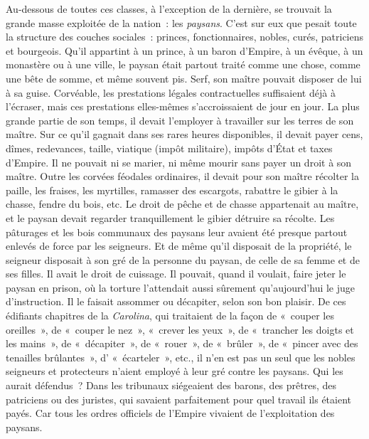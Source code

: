 \documentclass[french,twoside]{book} %
\begin{document}
Au-dessous de toutes ces classes, à l’exception de la dernière, se trouvait la grande masse exploitée de la nation : les \emph{paysans}. C’est sur eux que pesait toute la structure des couches sociales : princes, fonctionnaires, nobles, curés, patriciens et bourgeois. Qu’il appartint à un prince, à un baron d’Empire, à un évêque, à un monastère ou à une ville, le paysan était partout traité comme une chose, comme une bête de somme, et même souvent pis. Serf, son maître pouvait disposer de lui à sa guise. Corvéable, les prestations légales contractuelles suffisaient déjà à l’écraser, mais ces prestations elles-mêmes s’accroissaient de jour en jour. La plus grande partie de son temps, il devait l’employer à travailler sur les terres de son maître. Sur ce qu’il gagnait dans ses rares heures disponibles, il devait payer cens, dîmes, redevances, taille, viatique (impôt militaire), impôts d’État et taxes d’Empire. Il ne pouvait ni se marier, ni même mourir sans payer un droit à son maître. Outre les corvées féodales ordinaires, il devait pour son maître récolter la paille, les fraises, les myrtilles, ramasser des escargots, rabattre le gibier à la chasse, fendre du bois, etc. Le droit de pêche et de chasse appartenait au maître, et le paysan devait regarder tranquillement le gibier détruire sa récolte. Les pâturages et les bois communaux des paysans leur avaient été presque partout enlevés de force par les seigneurs. Et de même qu’il disposait de la propriété, le seigneur disposait à son gré de la personne du paysan, de celle de sa femme et de ses filles. Il avait le droit de cuissage. Il pouvait, quand il voulait, faire jeter le paysan en prison, où la torture l’attendait aussi sûrement qu’aujourd’hui le juge d’instruction. Il le faisait assommer ou décapiter, selon son bon plaisir. De ces édifiants chapitres de la \emph{Carolina}, qui traitaient de la façon de « couper les oreilles », de « couper le nez », « crever les yeux », de « trancher les doigts et les mains », de « décapiter », de « rouer », de « brûler », de « pincer avec des tenailles brûlantes », d’ « écarteler », etc., il n’en est pas un seul que les nobles seigneurs et protecteurs n’aient employé à leur gré contre les paysans. Qui les aurait défendus ? Dans les tribunaux siégeaient des barons, des prêtres, des patriciens ou des juristes, qui savaient parfaitement pour quel travail ils étaient payés. Car tous les ordres officiels de l’Empire vivaient de l’exploitation des paysans.\par
\end{document}

